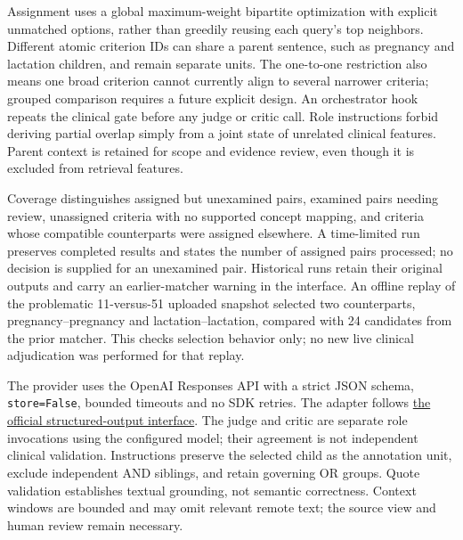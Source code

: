 \documentclass[10pt,letterpaper]{article}
\newcommand{\pathcode}[1]{\nolinkurl{#1}}
\begin{document}
Assignment uses a global maximum-weight bipartite optimization with explicit
unmatched options, rather than greedily reusing each query's top neighbors.
Different atomic criterion IDs can share a parent sentence, such as pregnancy
and lactation children, and remain separate units. The one-to-one restriction
also means one broad criterion cannot currently align to several narrower
criteria; grouped comparison requires a future explicit design. An orchestrator
hook repeats the clinical gate before any judge or critic call. Role instructions
forbid deriving partial overlap simply from a joint state of unrelated clinical
features. Parent context is retained for scope and evidence review, even though
it is excluded from retrieval features.

Coverage distinguishes assigned but unexamined pairs, examined pairs needing
review, unassigned criteria with no supported concept mapping, and criteria
whose compatible counterparts were assigned elsewhere. A time-limited run
preserves completed results and states the number of assigned pairs processed;
no decision is supplied for an unexamined pair. Historical runs retain their
original outputs and carry an earlier-matcher warning in the interface.
An offline replay of the problematic 11-versus-51 uploaded snapshot selected
two counterparts, pregnancy--pregnancy and lactation--lactation, compared with
24 candidates from the prior matcher. This checks selection behavior only;
no new live clinical adjudication was performed for that replay.

The provider uses the OpenAI Responses API with a strict JSON schema,
\pathcode{store=False}, bounded timeouts and no SDK retries. The adapter follows
\href{https://developers.openai.com/api/docs/guides/structured-outputs?api-mode=responses}{the official structured-output interface}.
The judge and critic are separate role invocations using the configured model;
their agreement is not independent clinical validation. Instructions preserve
the selected child as the annotation unit, exclude independent AND siblings,
and retain governing OR groups. Quote validation establishes textual grounding,
not semantic correctness. Context windows are bounded and may omit relevant
remote text; the source view and human review remain necessary.
\end{document}
